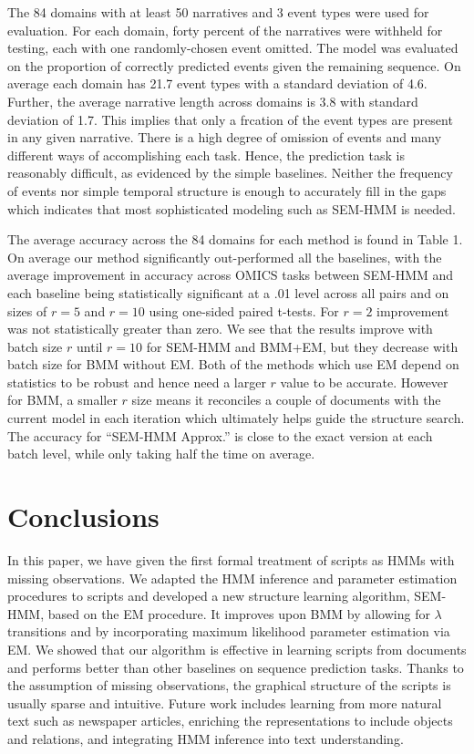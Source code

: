 \documentclass[letterpaper]{article}
\begin{document}
The 84 domains with at least 50 narratives and 3 event types were used for evaluation.
For each domain, forty percent of the narratives were withheld for testing, each with one randomly-chosen event omitted.  The model was evaluated on the proportion of correctly predicted events given the remaining sequence.
On average each domain has 21.7 event types with a standard deviation of 4.6.  Further, the average narrative length across domains is 3.8 with standard deviation of 1.7.  This implies that
only a frcation of the event types are present in any given narrative.
There is a high degree of omission of events and many different ways of accomplishing each task.
Hence, the prediction task is reasonably difficult, as evidenced by the simple baselines.
Neither the frequency of events nor simple temporal structure is enough to accurately fill in the gaps which indicates that most sophisticated modeling such as SEM-HMM is needed.

The average accuracy across the 84 domains for each method is found in Table 1.
On average our method significantly out-performed all the baselines, with the average improvement in accuracy across OMICS tasks between SEM-HMM and each baseline being statistically significant at a .01 level across all pairs and on sizes of $r = 5$ and $r= 10$ using one-sided paired t-tests.  For $r=2$ improvement was not statistically greater than zero. %
We see that the results improve with batch size $r$ until $r=10$ for
SEM-HMM and BMM+EM, but they decrease with batch size for BMM without EM.
Both of the methods which use EM depend on statistics to be robust and hence need a larger $r$ value to be accurate.  However for BMM, a smaller $r$ size means it reconciles a couple of documents with the current model in each iteration which ultimately helps guide the structure search.
The accuracy for ``SEM-HMM Approx.'' is close to the exact version at each batch level, while only taking half the time on average.




\section{Conclusions}

In this paper, we have given the first formal treatment of scripts as
HMMs with missing observations.
We adapted the HMM inference and parameter estimation procedures
to scripts and developed a new structure
learning algorithm, SEM-HMM, based on the EM procedure.
It improves upon BMM by allowing for $\lambda$ transitions and by
incorporating maximum likelihood parameter estimation via EM.
We showed that our algorithm is effective in learning scripts from
documents and performs better than
other baselines on sequence prediction tasks. Thanks to the
assumption of missing observations, the graphical
structure of the scripts is usually sparse and intuitive.
Future work includes learning from more natural text such as
newspaper articles, enriching the representations to include objects and
relations, and integrating HMM inference into text understanding.
\end{document}
